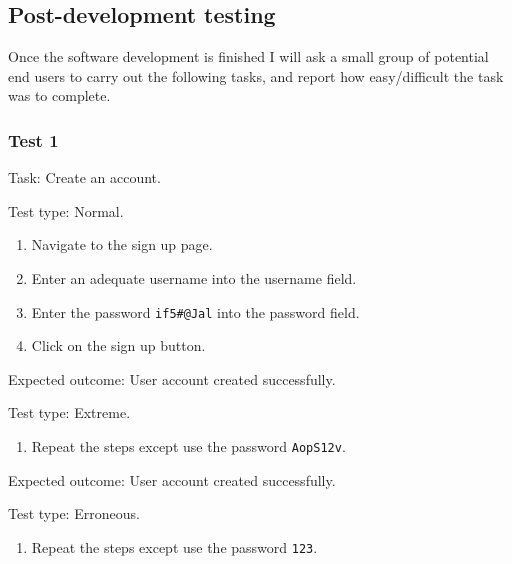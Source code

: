 \subsection{Post-development testing}

Once the software development is finished I will ask a
small group of potential end users to carry out the following
tasks, and report how easy/difficult the task was to complete.

\subsubsection{Test 1}

{\sffamily Task:} Create an account.\\

{\color{gray} \hrulefill}

{\sffamily Test type: Normal.}

\begin{enumerate}
  \item Navigate to the sign up page.
  \item Enter an adequate username into the username field.
  \item Enter the password \texttt{if5\#@Jal} into the password field.
  \item Click on the sign up button.
\end{enumerate}

{\sffamily Expected outcome:} User account created successfully. \\

{\color{gray} \hrulefill}

{\sffamily Test type: Extreme.}\\

\begin{enumerate}
\item Repeat the steps except use the password \texttt{AopS12v}.\\
\end{enumerate}

{\sffamily Expected outcome:} User account created successfully.\\

{\color{gray} \hrulefill}

{\sffamily Test type: Erroneous.} \\

\begin{enumerate}
\item Repeat the steps except use the password \texttt{123}.
\end{enumerate}

